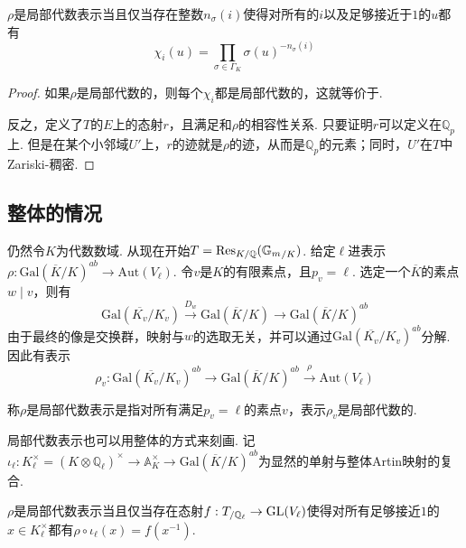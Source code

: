 \begin{cprop}
    $\rho$是局部代数表示当且仅当存在整数$n_{\sigma}(i)$使得对所有的$i$以及足够接近于$1$的$u$都有
    \begin{equation}
        \chi_i(u) = \prod_{\sigma\in \Gamma_K} \sigma(u)^{-n_{\sigma}(i)} \label{eqns::temp::1}
    \end{equation}
\end{cprop}

\begin{proof}
    如果$\rho$是局部代数的，则每个$\chi_i$都是局部代数的，这就等价于.

    反之，定义了$T$的$E$上的态射$r$，且满足和$\rho$的相容性关系. 只要证明$r$可以定义在$\mathbb{Q}_p$上. 但是在某个小邻域$U'$上，$r$的迹就是$\rho$的迹，从而是$\mathbb{Q}_p$的元素；同时，$U'$在$T$中Zariski-稠密.
\end{proof}

\subsection{整体的情况}
仍然令$K$为代数数域.
从现在开始$T=\mathrm{Res}_{K/\mathbb{Q}}({\mathbb{G}_m}_{/K})$.
给定$\ell$进表示$\rho: \mathrm{Gal}(\overline{K}/K)^{ab}\to \mathrm{Aut}(V_{\ell})$. 令$v$是$K$的有限素点，且$p_v = \ell$. 选定一个$\overline{K}$的素点$w\mid v$，则有
\begin{equation}
    \mathrm{Gal}(\overline{K_v}/K_v) \xrightarrow{D_{w}} \mathrm{Gal}(\overline{K}/K) \to \mathrm{Gal}(\overline{K}/K)^{ab}
\end{equation}
由于最终的像是交换群，映射与$w$的选取无关，并可以通过$\mathrm{Gal}(\overline{K_v}/K_v)^{ab}$分解. 因此有表示
\begin{equation}
    \rho_v: \mathrm{Gal}(\overline{K_v}/K_v)^{ab} \to \mathrm{Gal}(\overline{K}/K)^{ab} \xrightarrow{\rho} \mathrm{Aut}(V_{\ell})
\end{equation}

\begin{cdef}
    称$\rho$是局部代数表示是指对所有满足$p_v=\ell$的素点$v$，表示$\rho_v$是局部代数的.
\end{cdef}

局部代数表示也可以用整体的方式来刻画. 记$\iota_{\ell}: K_{\ell}^{\times}=(K\otimes \mathbb{Q}_{\ell})^{\times} \to \mathbb{A}_{K}^{\times} \to \mathrm{Gal}(\overline{K}/K)^{ab}$为显然的单射与整体Artin映射的复合.

\begin{cprop}
    $\rho$是局部代数表示当且仅当存在态射$f: {T}_{/\mathbb{Q}_{\ell}} \to \mathrm{GL}(V_{\ell})$使得对所有足够接近$1$的$x\in K_{\ell}^{\times}$都有$\rho\circ \iota_{\ell}(x) = f(x^{-1})$.
\end{cprop}

